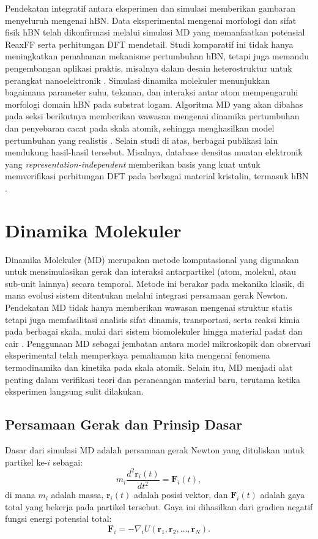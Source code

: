 Pendekatan integratif antara eksperimen dan simulasi memberikan gambaran menyeluruh mengenai hBN. Data eksperimental mengenai morfologi dan sifat fisik hBN telah dikonfirmasi melalui simulasi MD yang memanfaatkan potensial ReaxFF serta perhitungan DFT mendetail. Studi komparatif ini tidak hanya meningkatkan pemahaman mekanisme pertumbuhan hBN, tetapi juga memandu pengembangan aplikasi praktis, misalnya dalam desain heterostruktur untuk perangkat nanoelektronik \citep{Lele2022}. Simulasi dinamika molekuler menunjukkan bagaimana parameter suhu, tekanan, dan interaksi antar atom mempengaruhi morfologi domain hBN pada substrat logam. Algoritma MD yang akan dibahas pada seksi berikutnya memberikan wawasan mengenai dinamika pertumbuhan dan penyebaran cacat pada skala atomik, sehingga menghasilkan model pertumbuhan yang realistis \citep{Lele2022}. Selain studi di atas, berbagai publikasi lain mendukung hasil-hasil tersebut. Misalnya, database densitas muatan elektronik yang \emph{representation-independent} memberikan basis yang kuat untuk memverifikasi perhitungan DFT pada berbagai material kristalin, termasuk hBN \citep{Shen2022}. %
\section{Dinamika Molekuler}
Dinamika Molekuler (MD) merupakan metode komputasional yang digunakan untuk mensimulasikan gerak dan interaksi antarpartikel (atom, molekul, atau sub-unit lainnya) secara temporal. Metode ini berakar pada mekanika klasik, di mana evolusi sistem ditentukan melalui integrasi persamaan gerak Newton. Pendekatan MD tidak hanya memberikan wawasan mengenai struktur statis tetapi juga memfasilitasi analisis sifat dinamis, transportasi, serta reaksi kimia pada berbagai skala, mulai dari sistem biomolekuler hingga material padat dan cair \citep{Allen1989, Frenkel2002}. Penggunaan MD sebagai jembatan antara model mikroskopik dan observasi eksperimental telah memperkaya pemahaman kita mengenai fenomena termodinamika dan kinetika pada skala atomik. Selain itu, MD menjadi alat penting dalam verifikasi teori dan perancangan material baru, terutama ketika eksperimen langsung sulit dilakukan. \subsection{Persamaan Gerak dan Prinsip Dasar}
Dasar dari simulasi MD adalah persamaan gerak Newton yang dituliskan untuk partikel ke-\(i\) sebagai:
\begin{equation}
    m_i \frac{d^2 \mathbf{r}_i(t)}{dt^2} = \mathbf{F}_i(t),
\end{equation}
di mana \(m_i\) adalah massa, \(\mathbf{r}_i(t)\) adalah posisi vektor, dan \(\mathbf{F}_i(t)\) adalah gaya total yang bekerja pada partikel tersebut. Gaya ini dihasilkan dari gradien negatif fungsi energi potensial total:
\begin{equation}
    \mathbf{F}_i = -\nabla_i U(\mathbf{r}_1, \mathbf{r}_2, \ldots, \mathbf{r}_N).
 \end{equation}

